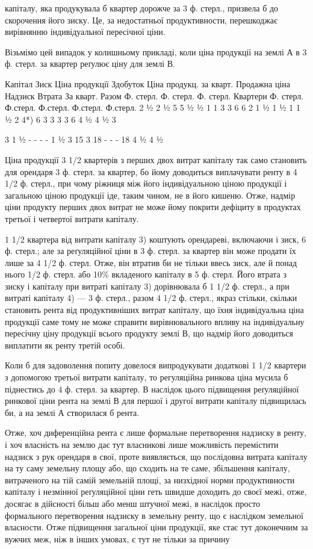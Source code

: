 капіталу, яка продукувала б квартер дорожче за 3 ф. стерл., призвела б до
скорочення його зиску. Це, за недостатньої продуктивности, перешкоджає вирівнянню індивідуальної
пересічної ціни.

Візьмімо цей випадок у колишньому прикладі, коли ціна продукції на
землі А в 3 ф. стерл. за квартер реґулює ціну для землі В.

Капітал Зиск Ціна продукції  Здобуток Ціна продукц. за кварт. Продажна ціна Надзиск Втрата
     За кварт. Разом
Ф. стерл. Ф. стерл. Ф. стерл.
 Квартери Ф. стерл. Ф.стерл. Ф.стерл. Ф.стерл. Ф.стерл.
2 ½
2 ½
5
5 ½
½
1
1 3
3
6
6 2
1 ½
1 ½
1 1 ½
2
4*)
6 3
3
3
3 6
4 ½
4 ½
3

 3
1 ½
-
- -
-
1 ½
3
15 3 18 - - - 18 4 ½
 4 ½

Ціна продукції 3 1/2 квартерів з перших двох витрат капіталу так само
становить для орендаря 3 ф. стерл. за квартер, бо йому доводиться виплачувати
ренту в 4  1/2 ф. стерл., при чому ріжниця між його індивідуальною ціною продукції
і загальною ціною продукції іде, таким чином, не в його кишеню. Отже,
надмір ціни продукту перших двох витрат не може йому покрити дефіциту
в продуктах третьої і четвертої витрати капіталу.

1 1/2 квартера від витрати капіталу 3) коштують орендареві, включаючи
і зиск, 6 ф. стерл.; але за реґуляційної ціни в 3 ф. стерл. за квартер він може
продати їх лише за 4  1/2 ф. стерл. Отже, він втратив би не тільки ввесь
зиск, але й понад нього 1/2  ф. стерл. або  10\% вкладеного капіталу в 5 ф. стерл.
Його втрата з зиску і капіталу при витраті капіталу 3) дорівнювала б  1  1/2
ф. стерл., а при витраті капіталу 4) — 3 ф. стерл., разом 4  1/2 ф. стерл., якраз
стільки, скільки становить рента від продуктивніших витрат капіталу, що їхня
індивідуальна ціна продукції саме тому не може справити вирівнювального
впливу на індивідуальну пересічну ціну продукції всього продукту землі В, що
надмір його доводиться виплатити як ренту третій особі.

Коли б для задоволення попиту довелося випродукувати додаткові 1  1/2
квартери з допомогою третьої витрати капіталу, то регуляційна ринкова ціна
мусила б піднестись до 4 ф. стерл. за квартер. В наслідок цього підвищення
реґуляційної ринкової ціни рента на землі В для першої і другої витрати капіталу
підвищилась би, а на землі А створилася б рента.

Отже, хоч диференційна рента є лише формальне перетворення надзиску
в ренту, і хоч власність на землю дає тут власникові лише можливість перемістити
надзиск з рук орендаря в свої, проте виявляється, що послідовна витрата
капіталу на ту саму земельну площу або, що сходить на те саме, збільшення
капіталу, витраченого на тій самій земельній площі, за низхідної норми
продуктивности капіталу і незмінної реґуляційної ціни геть швидше доходить
до своєї межі, отже, досягає в дійсності більш або менш штучної межі, в наслідок
просто формального перетворення надзиску в земельну ренту, що є наслідком
земельної власности. Отже підвищення загальної ціни продукції, яке стає
тут доконечним за вужчих меж, ніж в інших умовах, є тут не тільки за причину
